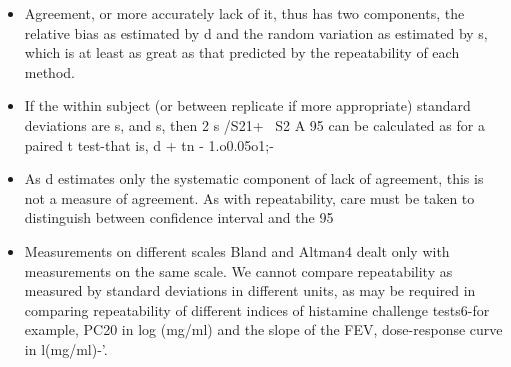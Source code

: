 \documentclass{article}
\begin{document}
\begin{itemize}
\item Agreement, or more accurately lack of it, thus
has two components, the relative bias as estimated by d and the random variation as
estimated by s, which is at least as great as that
predicted by the repeatability of each method.
\item If the within subject (or between replicate if
more appropriate) standard deviations are s,
and s, then
2 s /S21+ ~S2
A 95%
can be calculated as for a paired t test-that is,
d + tn - 1.o0.05o1;-
\item As d estimates only the systematic component
of lack of agreement, this is not a measure of agreement. As with repeatability, care must be taken to distinguish between confidence
interval and the 95%
\newpage
\item Measurements on different scales
Bland and Altman4 dealt only with
measurements on the same scale. We cannot
compare repeatability as measured by standard
deviations in different units, as may be required
in comparing repeatability of different indices
of histamine challenge tests6-for example,
PC20 in log (mg/ml) and the slope of the FEV,
dose-response curve in l(mg/ml)-'. 
\end{itemize}
\end{document}

